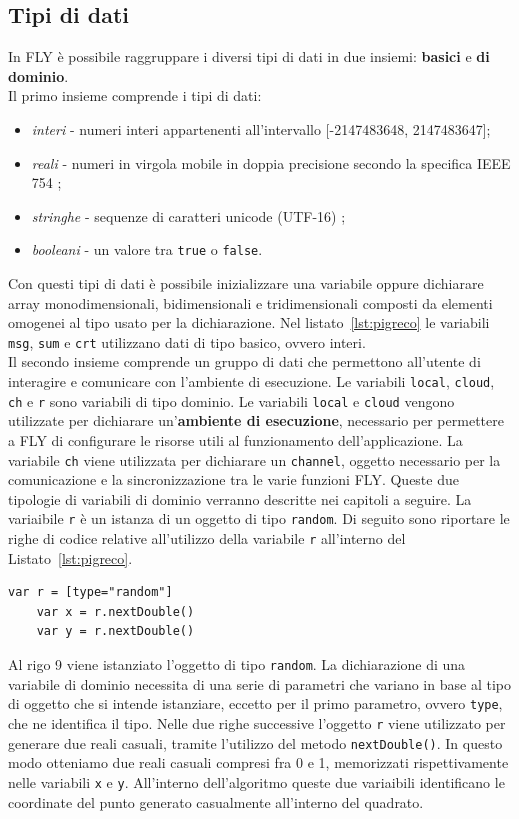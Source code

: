 \subsection{Tipi di dati}
In FLY è possibile raggruppare i diversi tipi di dati in due insiemi: \textbf{basici} e \textbf{di dominio}. \\
Il primo insieme comprende i tipi di dati:
\begin{itemize} 
    \item \textit{interi} - numeri interi appartenenti all’intervallo [-2147483648, 2147483647];
    \item \textit{reali} - numeri in virgola mobile in doppia precisione secondo la specifica IEEE 754 \cite{ieee};
    \item \textit{stringhe} - sequenze di caratteri unicode (UTF-16) \cite{utf};
    \item \textit{booleani} - un valore tra \verb|true| o \verb|false|.
\end{itemize}
Con questi tipi di dati è possibile inizializzare una variabile oppure dichiarare array monodimensionali, bidimensionali e tridimensionali composti da elementi omogenei al tipo usato per la dichiarazione. Nel listato~\ref{lst:pigreco} le variabili \verb|msg|, \verb|sum| e \verb|crt| utilizzano dati di tipo basico, ovvero interi. \\
Il secondo insieme comprende un gruppo di dati che permettono all'utente di interagire e comunicare con l'ambiente di esecuzione. Le variabili \verb|local|, \verb|cloud|, \verb|ch| e \verb|r| sono variabili di tipo dominio. Le variabili \verb|local| e \verb|cloud| vengono utilizzate per dichiarare un'\textbf{ambiente di esecuzione}, necessario per permettere a FLY di configurare le risorse utili al funzionamento dell'applicazione. La variabile \verb|ch| viene utilizzata per dichiarare un \verb|channel|, oggetto necessario per la comunicazione e la sincronizzazione tra le varie funzioni FLY. Queste due tipologie di variabili di dominio verranno descritte nei capitoli a seguire. La variaibile \verb|r| è un istanza di un oggetto di tipo \verb|random|. Di seguito sono riportare le righe di codice relative all'utilizzo della variabile \verb|r| all'interno del Listato~\ref{lst:pigreco}.
\begin{lstlisting}[language=FLY,firstnumber=9,label={lst:r},belowskip=-0.8 \baselineskip]
    var r = [type="random"]
    var x = r.nextDouble()
    var y = r.nextDouble()
\end{lstlisting}
Al rigo 9 viene istanziato l'oggetto di tipo \verb|random|. La dichiarazione di una variabile di dominio necessita di una serie di parametri che variano in base al tipo di oggetto che si intende istanziare, eccetto per il primo parametro, ovvero \verb|type|, che ne identifica il tipo. Nelle due righe successive l'oggetto \verb|r| viene utilizzato per generare due reali casuali, tramite l'utilizzo del metodo \verb|nextDouble()|. In questo modo otteniamo due reali casuali compresi fra 0 e 1, memorizzati rispettivamente nelle variabili \verb|x| e \verb|y|. All'interno dell'algoritmo queste due variaibili identificano le coordinate del punto generato casualmente all'interno del quadrato.

